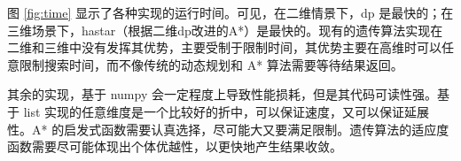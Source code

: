     图 \ref{fig:time} 显示了各种实现的运行时间。可见，在二维情景下，dp 是最快的；在三维场景下，hastar（根据二维dp改进的A*）是最快的。现有的遗传算法实现在二维和三维中没有发挥其优势，主要受制于限制时间，其优势主要在高维时可以任意限制搜索时间，而不像传统的动态规划和 A* 算法需要等待结果返回。
    
    其余的实现，基于 numpy 会一定程度上导致性能损耗，但是其代码可读性强。基于 list 实现的任意维度是一个比较好的折中，可以保证速度，又可以保证延展性。A* 的启发式函数需要认真选择，尽可能大又要满足限制。遗传算法的适应度函数需要尽可能体现出个体优越性，以更快地产生结果收敛。

    

